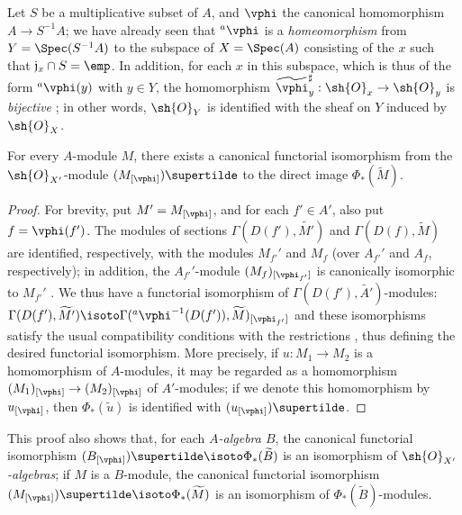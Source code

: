 \begin{example}[1.6.2]
\label{I.1.6.2}
Let $S$ be a multiplicative subset of $A$, and $\vphi$ the canonical homomorphism $A\to S^{-1}A$;
we have already seen  that ${}^a\vphi$ is a \emph{homeomorphism} from $Y=\Spec(S^{-1}A)$ to the subspace of $X=\Spec(A)$ consisting of the $x$ such that $\mathfrak{j}_x\cap S=\emp$.
In addition, for each $x$ in this subspace, which is thus of the form ${}^a\vphi(y)$ with $y\in Y$, the homomorphism $\widetilde{\vphi}_y^\sharp:\sh{O}_x\to\sh{O}_y$ is
\emph{bijective} ;
in other words, $\sh{O}_Y$ is identified with the sheaf on $Y$ induced by $\sh{O}_X$.
\end{example}

\begin{proposition}[1.6.3]
\label{I.1.6.3}
For every $A$-module $M$, there exists a canonical functorial isomorphism from the $\sh{O}_{X'}$-module $(M_{[\vphi]})\supertilde$ to the direct image $\Phi_*(\widetilde{M})$.
\end{proposition}

\begin{proof}
For brevity, put $M'=M_{[\vphi]}$, and for each $f'\in A'$, also put $f=\vphi(f')$.
The modules of sections $\Gamma(D(f'),\widetilde{M'})$ and $\Gamma(D(f),\widetilde{M})$ are identified, respectively, with the modules $M_{f'}'$ and $M_f$ (over $A_{f'}'$ and $A_f$, respectively);
in addition, the $A_{f'}'$-module $(M_f)_{[\vphi_{f'}]}$ is canonically isomorphic to $M_{f'}'$ .
We thus have a functorial isomorphism of $\Gamma(D(f'),\widetilde{A'})$-modules: $\Gamma(D(f'),\widetilde{M'}) \isoto\Gamma({}^a\vphi^{-1}(D(f')),\widetilde{M})_{[\vphi_{f'}]}$ and these isomorphisms satisfy the usual compatibility conditions with the restrictions , thus defining the desired functorial isomorphism.
More precisely, if $u:M_1\to M_2$ is a homomorphism of $A$-modules, it may be regarded as a homomorphism $(M_1)_{[\vphi]}\to(M_2)_{[\vphi]}$ of $A'$-modules;
if we denote this homomorphism by $u_{[\vphi]}$, then $\Phi_*(\widetilde{u})$ is identified with $(u_{[\vphi]})\supertilde$.
\end{proof}

This proof also shows that, for each \emph{$A$-algebra $B$}, the canonical functorial isomorphism
$(B_{[\vphi]})\supertilde\isoto\Phi_*(\widetilde{B})$ is an isomorphism of \emph{$\sh{O}_{X'}$-algebras};
if $M$ is a $B$-module, the canonical functorial isomorphism $(M_{[\vphi]})\supertilde\isoto\Phi_*(\widetilde{M})$ is an isomorphism of $\Phi_*(\widetilde{B})$-modules.

